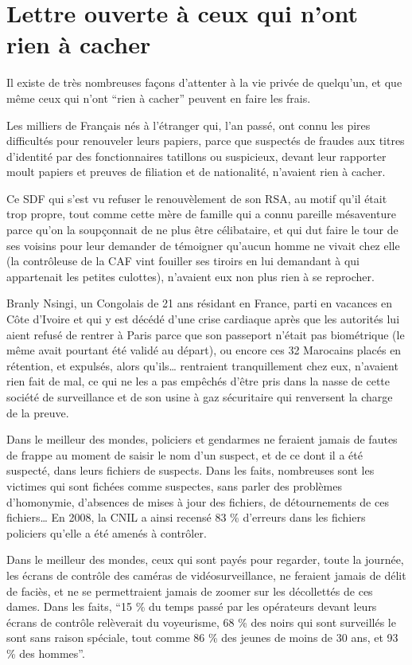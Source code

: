 \section{Lettre ouverte à ceux qui n'ont rien à cacher}

Il existe de très nombreuses façons d'attenter à la vie privée de quelqu'un, et que même ceux qui n'ont \enquote{rien à cacher} peuvent en faire les frais.

Les milliers de Français nés à l'étranger qui, l'an passé, ont connu les pires difficultés pour renouveler leurs papiers, parce que suspectés de fraudes aux titres d'identité par des fonctionnaires tatillons ou suspicieux, devant leur rapporter moult papiers et preuves de filiation et de nationalité, n'avaient rien à cacher.

Ce SDF qui s'est vu refuser le renouvèlement de son RSA, au motif qu'il était trop propre, tout comme cette mère de famille qui a connu pareille mésaventure parce qu'on la soupçonnait de ne plus être célibataire, et qui dut faire le tour de ses voisins pour leur demander de témoigner qu'aucun homme ne vivait chez elle (la contrôleuse de la CAF vint fouiller ses tiroirs en lui demandant à qui appartenait les petites culottes), n'avaient eux non plus rien à se reprocher.

Branly Nsingi, un Congolais de 21 ans résidant en France, parti en vacances en Côte d'Ivoire et qui y est décédé d'une crise cardiaque après que les autorités lui aient refusé de rentrer à Paris parce que son passeport n'était pas biométrique (le même avait pourtant été validé au départ), ou encore ces 32 Marocains placés en rétention, et expulsés, alors qu'ils… rentraient tranquillement chez eux, n'avaient rien fait de mal, ce qui ne les a pas empêchés d'être pris dans la nasse de cette société de surveillance et de son usine à gaz sécuritaire qui renversent la charge de la preuve.

Dans le meilleur des mondes, policiers et gendarmes ne feraient jamais de fautes de frappe au moment de saisir le nom d'un suspect, et de ce dont il a été suspecté, dans leurs fichiers de suspects. Dans les faits, nombreuses sont les victimes qui sont fichées comme suspectes, sans parler des problèmes d'homonymie, d'absences de mises à jour des fichiers, de détournements de ces fichiers… En 2008, la CNIL a ainsi recensé 83 \% d'erreurs dans les fichiers policiers qu'elle a été amenés à contrôler.

Dans le meilleur des mondes, ceux qui sont payés pour regarder, toute la journée, les écrans de contrôle des caméras de vidéosurveillance, ne feraient jamais de délit de faciès, et ne se permettraient jamais de zoomer sur les décollettés de ces dames. Dans les faits, \enquote{15 \% du temps passé par les opérateurs devant leurs écrans de contrôle relèverait du voyeurisme, 68 \% des noirs qui sont surveillés le sont sans raison spéciale, tout comme 86 \% des jeunes de moins de 30 ans, et 93 \% des hommes}.

